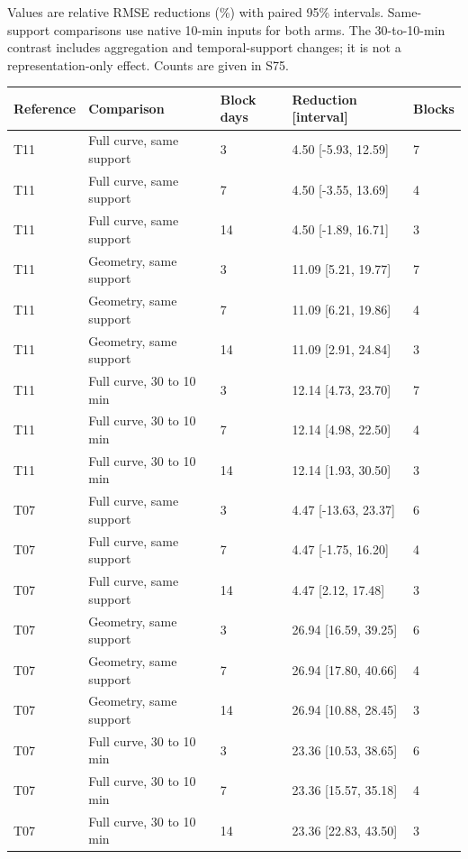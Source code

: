 \documentclass[a4paper,11pt]{article}
\newcounter{none}
\begin{document}
Values are relative RMSE reductions (\%) with paired 95\% intervals. Same-support comparisons use native 10-min inputs for both arms. The 30-to-10-min contrast includes aggregation and temporal-support changes; it is not a representation-only effect. Counts are given in S75.

{\def\LTcaptype{none} %
\begingroup{}\setlength{\tabcolsep}{3pt}
\begin{longtable}[]{@{}lllll@{}}
\toprule\noalign{}
Reference & Comparison & Block days & Reduction {[}interval{]} & Blocks \\
\midrule\noalign{}
\endhead
\bottomrule\noalign{}
\endlastfoot
T11 & Full curve, same support & 3 & 4.50 {[}-5.93, 12.59{]} & 7 \\
T11 & Full curve, same support & 7 & 4.50 {[}-3.55, 13.69{]} & 4 \\
T11 & Full curve, same support & 14 & 4.50 {[}-1.89, 16.71{]} & 3 \\
T11 & Geometry, same support & 3 & 11.09 {[}5.21, 19.77{]} & 7 \\
T11 & Geometry, same support & 7 & 11.09 {[}6.21, 19.86{]} & 4 \\
T11 & Geometry, same support & 14 & 11.09 {[}2.91, 24.84{]} & 3 \\
T11 & Full curve, 30 to 10 min & 3 & 12.14 {[}4.73, 23.70{]} & 7 \\
T11 & Full curve, 30 to 10 min & 7 & 12.14 {[}4.98, 22.50{]} & 4 \\
T11 & Full curve, 30 to 10 min & 14 & 12.14 {[}1.93, 30.50{]} & 3 \\
T07 & Full curve, same support & 3 & 4.47 {[}-13.63, 23.37{]} & 6 \\
T07 & Full curve, same support & 7 & 4.47 {[}-1.75, 16.20{]} & 4 \\
T07 & Full curve, same support & 14 & 4.47 {[}2.12, 17.48{]} & 3 \\
T07 & Geometry, same support & 3 & 26.94 {[}16.59, 39.25{]} & 6 \\
T07 & Geometry, same support & 7 & 26.94 {[}17.80, 40.66{]} & 4 \\
T07 & Geometry, same support & 14 & 26.94 {[}10.88, 28.45{]} & 3 \\
T07 & Full curve, 30 to 10 min & 3 & 23.36 {[}10.53, 38.65{]} & 6 \\
T07 & Full curve, 30 to 10 min & 7 & 23.36 {[}15.57, 35.18{]} & 4 \\
T07 & Full curve, 30 to 10 min & 14 & 23.36 {[}22.83, 43.50{]} & 3 \\

\end{longtable}}
\end{document}
